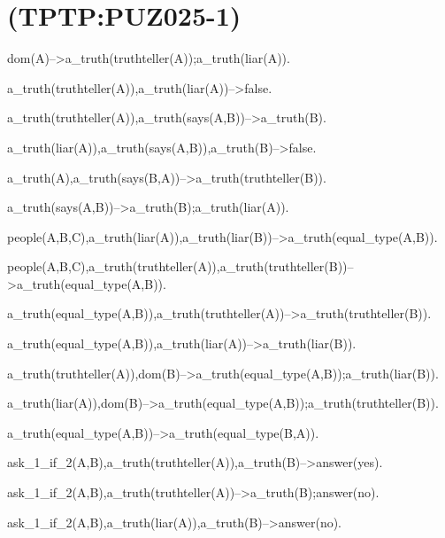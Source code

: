 \section{(TPTP:PUZ025-1)}



dom(A)-->a_truth(truthteller(A));a_truth(liar(A)).

a_truth(truthteller(A)),a_truth(liar(A))-->false.

a_truth(truthteller(A)),a_truth(says(A,B))-->a_truth(B).

a_truth(liar(A)),a_truth(says(A,B)),a_truth(B)-->false.

a_truth(A),a_truth(says(B,A))-->a_truth(truthteller(B)).

a_truth(says(A,B))-->a_truth(B);a_truth(liar(A)).

people(A,B,C),a_truth(liar(A)),a_truth(liar(B))-->a_truth(equal_type(A,B)).

people(A,B,C),a_truth(truthteller(A)),a_truth(truthteller(B))-->a_truth(equal_type(A,B)).

a_truth(equal_type(A,B)),a_truth(truthteller(A))-->a_truth(truthteller(B)).

a_truth(equal_type(A,B)),a_truth(liar(A))-->a_truth(liar(B)).

a_truth(truthteller(A)),dom(B)-->a_truth(equal_type(A,B));a_truth(liar(B)).

a_truth(liar(A)),dom(B)-->a_truth(equal_type(A,B));a_truth(truthteller(B)).

a_truth(equal_type(A,B))-->a_truth(equal_type(B,A)).

ask_1_if_2(A,B),a_truth(truthteller(A)),a_truth(B)-->answer(yes).

ask_1_if_2(A,B),a_truth(truthteller(A))-->a_truth(B);answer(no).

ask_1_if_2(A,B),a_truth(liar(A)),a_truth(B)-->answer(no).

